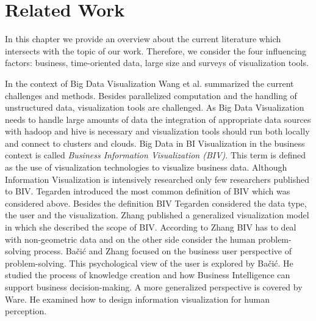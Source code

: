 \chapter{Related Work}
\label{chap:related Work}
In this chapter we provide an overview about the current literature which intersects with the topic of our work. Therefore, we consider the four influencing factors: business, time-oriented data, large size and surveys of visualization tools. 
\par
In the context of Big Data Visualization Wang et al. summarized the current challenges and methods. Besides parallelized computation and the handling of unstructured data, visualization tools are challenged. As Big Data Visualization needs to handle large amounts of data the integration of appropriate data sources with hadoop and hive is necessary and visualization tools should run both locally and connect to clusters and clouds\cite{Wang2015}.
Big Data in BI  Visualization in the business context is called \textit{Business Information Visualization (BIV)}. This term is defined as the use of visualization technologies to visualize business data\cite{Tegarden1999}. Although Information Visualization is intensively researched\cite{Shneiderman2008,Shneiderman2002,Shneiderman1996,Keim2002} only few researchers published to BIV. Tegarden\cite{Tegarden1999} introduced the most common definition of BIV which was considered above.  Besides the definition BIV Tegarden considered the data type, the user and the visualization.   Zhang\cite{Zhang,Zhang1998,Zhang2001} published a generalized visualization model in which she described the scope of BIV. According to Zhang BIV has to deal with non-geometric data and on the other side consider the human problem-solving process. Bačić and Zhang focused on the business user perspective of problem-solving. This psychological view of the user is explored by Bačić. He studied the process of knowledge creation\cite{Bacic2012} and how Business Intelligence can support business decision-making\cite{Bacic,Bacic2012}. A more generalized perspective is covered by Ware\cite{Ware2012a}. He examined how to design information visualization for human perception. 
\par
